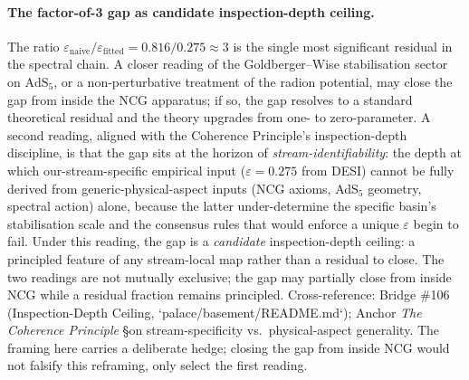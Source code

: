\paragraph{The factor-of-3 gap as candidate inspection-depth ceiling.}
The ratio $\varepsilon_\mathrm{naive}/\varepsilon_\mathrm{fitted} = 0.816/0.275 \approx 3$ is the single most significant residual in the spectral chain.  A closer reading of the Goldberger--Wise stabilisation sector on $\mathrm{AdS}_5$, or a non-perturbative treatment of the radion potential, may close the gap from inside the NCG apparatus; if so, the gap resolves to a standard theoretical residual and the theory upgrades from one- to zero-parameter.  A second reading, aligned with the Coherence Principle's inspection-depth discipline, is that the gap sits at the horizon of \emph{stream-identifiability}: the depth at which our-stream-specific empirical input ($\varepsilon = 0.275$ from DESI) cannot be fully derived from generic-physical-aspect inputs (NCG axioms, AdS$_5$ geometry, spectral action) alone, because the latter under-determine the specific basin's stabilisation scale and the consensus rules that would enforce a unique $\varepsilon$ begin to fail.  Under this reading, the gap is a \emph{candidate} inspection-depth ceiling: a principled feature of any stream-local map rather than a residual to close.  The two readings are not mutually exclusive; the gap may partially close from inside NCG while a residual fraction remains principled.  Cross-reference: Bridge \#106 (Inspection-Depth Ceiling, `palace/basement/README.md`); Anchor \emph{The Coherence Principle} \S on stream-specificity vs.\ physical-aspect generality.  The framing here carries a deliberate hedge; closing the gap from inside NCG would not falsify this reframing, only select the first reading.

